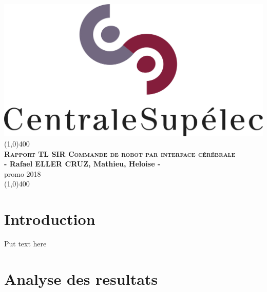 \documentclass[11pt]{article}
\begin{document}

\begin{titlepage}
\begin{center}
\includegraphics[scale=0.5]{CentraleSupelec.jpeg}\\
\vfill
\line(1,0){400}\\[1mm]
\huge{\textsc{\textbf{Rapport TL SIR Commande de robot par interface cérébrale}}}\\[3mm]
\Large{\textbf{- Rafael ELLER CRUZ, Mathieu, Heloise -}}\\[1mm]
\Large{promo 2018}\\[1mm]
\line(1,0){400}\\[1mm]
\vfill
\end{center}
\end{titlepage}


\tableofcontents
\thispagestyle{empty}
\cleardoublepage


\setcounter{page}{1}
\section{Introduction}
Put text here

\cleardoublepage


\section{Analyse des resultats}
\end{document}

